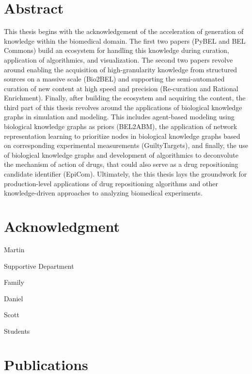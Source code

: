 \chapter*{Abstract}

This thesis begins with the acknowledgement of the acceleration of generation of knowledge within the biomedical domain.
The first two papers (PyBEL and BEL Commons) build an ecosystem for handling this knowledge during curation, application of algorithmics, and visualization.
The second two papers revolve around enabling the acquisition of
high-granularity knowledge from structured sources on a massive scale (Bio2BEL) and supporting the semi-automated curation of new content at high speed and precision (Re-curation and Rational Enrichment).
Finally, after building the ecosystem and acquiring the content, the third part of this thesis revolves around the applications of biological knowledge graphs in simulation and modeling.
This includes agent-based modeling using biological knowledge graphs as priors (BEL2ABM), the application of network representation learning to prioritize nodes in biological knowledge graphs based on corresponding experimental measurements (GuiltyTargets), and finally, the use of biological knowledge graphs and development of algorithmics to deconvolute the mechanism of action of drugs, that could also serve as a drug repositioning candidate identifier (EpiCom).
Ultimately, the this thesis lays the groundwork for production-level applications of drug repositioning algorithms and other knowledge-driven approaches to analyzing biomedical experiments.

\setlength{\parskip}{1em}                                %
\renewcommand{\baselinestretch}{1.2}                    %

\chapter*{Acknowledgment}

Martin

Supportive Department

Family

Daniel

Scott

Students

\chapter*{Publications}


